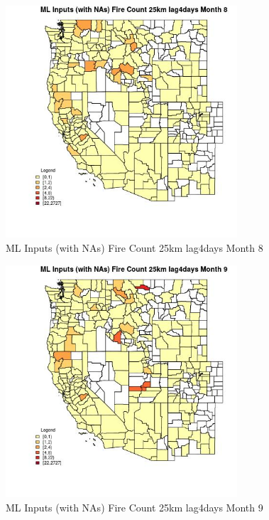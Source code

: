 \begin{figure} 
\centering  
\includegraphics[width=0.77\textwidth]{Code_Outputs/Report_ML_input_PM25_Step4_part_f_de_duplicated_aveswNAs_CountyFire_Count_25km_lag4daysmedianMonth8.jpg} 
\caption{\label{fig:Report_ML_input_PM25_Step4_part_f_de_duplicated_aveswNAsCountyFire_Count_25km_lag4daysmedianMonth8}ML Inputs (with NAs) Fire Count 25km lag4days Month 8} 
\end{figure} 
 

\clearpage 

\begin{figure} 
\centering  
\includegraphics[width=0.77\textwidth]{Code_Outputs/Report_ML_input_PM25_Step4_part_f_de_duplicated_aveswNAs_CountyFire_Count_25km_lag4daysmedianMonth9.jpg} 
\caption{\label{fig:Report_ML_input_PM25_Step4_part_f_de_duplicated_aveswNAsCountyFire_Count_25km_lag4daysmedianMonth9}ML Inputs (with NAs) Fire Count 25km lag4days Month 9} 
\end{figure} 
 

